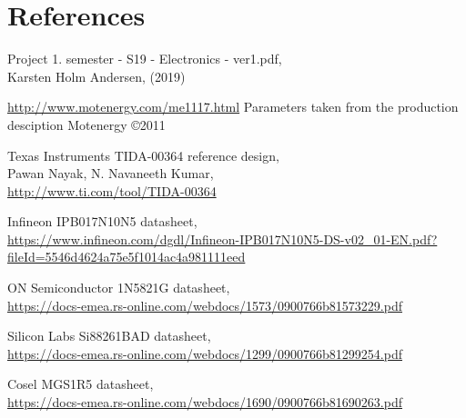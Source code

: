 \section{References}
\label{sec:references}


\begin{thebibliography}{9}
Project 1. semester - S19 - Electronics - ver1.pdf, \\
Karsten Holm Andersen, (2019)

\url{http://www.motenergy.com/me1117.html}
Parameters taken from the production desciption
Motenergy \copyright 2011

Texas Instruments TIDA-00364 reference design, \\
Pawan Nayak, N. Navaneeth Kumar, \\
\url{http://www.ti.com/tool/TIDA-00364}

Infineon IPB017N10N5 datasheet, \\
\url{https://www.infineon.com/dgdl/Infineon-IPB017N10N5-DS-v02_01-EN.pdf?fileId=5546d4624a75e5f1014ac4a981111eed}

ON Semiconductor 1N5821G datasheet, \\
\url{https://docs-emea.rs-online.com/webdocs/1573/0900766b81573229.pdf}

Silicon Labs Si88261BAD datasheet, \\
\url{https://docs-emea.rs-online.com/webdocs/1299/0900766b81299254.pdf}

Cosel MGS1R5 datasheet, \\
\url{https://docs-emea.rs-online.com/webdocs/1690/0900766b81690263.pdf}

\end{thebibliography}